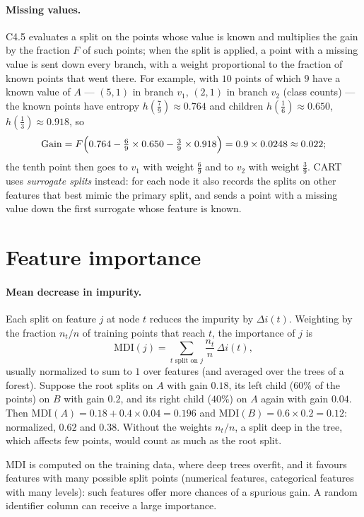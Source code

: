 \begin{notechapter}
\paragraph{Missing values.} C4.5 evaluates a split on the points whose value is known and
multiplies the gain by the fraction $F$ of such points; when the split is applied, a point
with a missing value is sent down every branch, with a weight proportional to the
fraction of known points that went there. For example, with $10$ points of which $9$ have a
known value of $A$ --- $(5, 1)$ in branch $v_1$, $(2, 1)$ in branch $v_2$ (class counts) --- the known points
have entropy $h(\frac79)\approx0.764$ and children $h(\frac16)\approx0.650$, $h(\frac13)\approx0.918$, so
\[
  \mathrm{Gain} = F\Bigl(0.764 - \tfrac69\times0.650 - \tfrac39\times0.918\Bigr) = 0.9\times0.0248\approx0.022 ;
\]
the tenth point then goes to $v_1$ with weight $\frac69$ and to $v_2$ with weight $\frac39$. CART uses
\emph{surrogate splits} instead: for each node it also records the splits on other
features that best mimic the primary split, and sends a point with a missing value
down the first surrogate whose feature is known.

\section{Feature importance}\label{decision-trees:sec:importance}

\paragraph{Mean decrease in impurity.} Each split on feature $j$ at node $t$ reduces the
impurity by $\Delta i(t)$. Weighting by the fraction $n_t/n$ of training points that reach $t$, the
importance of $j$ is
\[
  \mathrm{MDI}(j) = \sum_{t\text{ split on }j}\frac{n_t}n\,\Delta i(t),
\]
usually normalized to sum to $1$ over features (and averaged over the trees of a forest).
Suppose the root splits on $A$ with gain $0.18$, its left child ($60\%$ of the points) on $B$ with
gain $0.2$, and its right child ($40\%$) on $A$ again with gain $0.04$. Then
$\mathrm{MDI}(A) = 0.18 + 0.4\times0.04 = 0.196$ and $\mathrm{MDI}(B) = 0.6\times0.2 = 0.12$: normalized, $0.62$ and $0.38$.
Without the weights $n_t/n$, a split deep in the tree, which affects few points, would count
as much as the root split.

\begin{pitfall}
MDI is computed on the training data, where deep trees overfit, and it favours
features with many possible split points (numerical features, categorical features
with many levels): such features offer more chances of a spurious gain. A random
identifier column can receive a large importance.
\end{pitfall}


\end{notechapter}
